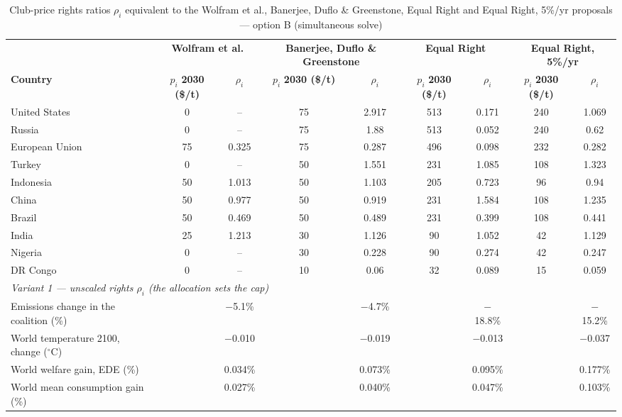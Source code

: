 \begin{table}[htbp]
\centering
\small
\caption{Club-price rights ratios $\rho_i$ equivalent to the Wolfram et al., Banerjee, Duflo \& Greenstone, Equal Right and Equal Right, 5\%/yr proposals --- option B (simultaneous solve)}
\renewcommand{\arraystretch}{1.15}
\begin{tabular}{lcccccccc}
  \toprule
  & \multicolumn{2}{c}{\textbf{Wolfram et al.}} & \multicolumn{2}{c}{\textbf{Banerjee, Duflo \& Greenstone}} & \multicolumn{2}{c}{\textbf{Equal Right}} & \multicolumn{2}{c}{\textbf{Equal Right, 5\%/yr}} \\
  \cmidrule(lr){2-3} \cmidrule(lr){4-5} \cmidrule(lr){6-7} \cmidrule(lr){8-9}
  \textbf{Country} & $p_i$ \textbf{2030 (\$/t)} & $\rho_i$ & $p_i$ \textbf{2030 (\$/t)} & $\rho_i$ & $p_i$ \textbf{2030 (\$/t)} & $\rho_i$ & $p_i$ \textbf{2030 (\$/t)} & $\rho_i$ \\
  \midrule
  United States & 0 & -- & 75 & 2.917 & 513 & 0.171 & 240 & 1.069 \\
  Russia & 0 & -- & 75 & 1.88 & 513 & 0.052 & 240 & 0.62 \\
  European Union & 75 & 0.325 & 75 & 0.287 & 496 & 0.098 & 232 & 0.282 \\
  Turkey & 0 & -- & 50 & 1.551 & 231 & 1.085 & 108 & 1.323 \\
  Indonesia & 50 & 1.013 & 50 & 1.103 & 205 & 0.723 & 96 & 0.94 \\
  China & 50 & 0.977 & 50 & 0.919 & 231 & 1.584 & 108 & 1.235 \\
  Brazil & 50 & 0.469 & 50 & 0.489 & 231 & 0.399 & 108 & 0.441 \\
  India & 25 & 1.213 & 30 & 1.126 & 90 & 1.052 & 42 & 1.129 \\
  Nigeria & 0 & -- & 30 & 0.228 & 90 & 0.274 & 42 & 0.247 \\
  DR Congo & 0 & -- & 10 & 0.06 & 32 & 0.089 & 15 & 0.059 \\
  \midrule
  \multicolumn{9}{l}{\textit{Variant 1 --- unscaled rights $\rho_i$ (the allocation sets the cap)}} \\
  \quad Emissions change in the coalition (\%) &  & $-$5.1\% &  & $-$4.7\% &  & $-$18.8\% &  & $-$15.2\% \\
  \quad World temperature 2100, change ($^\circ$C) &  & $-$0.010 &  & $-$0.019 &  & $-$0.013 &  & $-$0.037 \\
  \quad World welfare gain, EDE (\%) &  & 0.034\% &  & 0.073\% &  & 0.095\% &  & 0.177\% \\
  \quad World mean consumption gain (\%) &  & 0.027\% &  & 0.040\% &  & 0.047\% &  & 0.103\% \\

\end{tabular}
\end{table}
